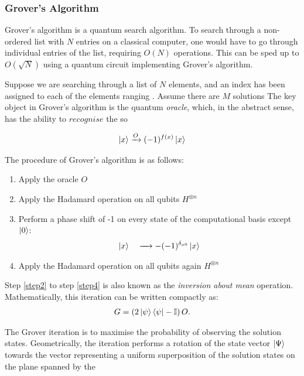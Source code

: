 \documentclass[bibliography=totocnumbered]{article}
\theoremstyle{NoticeStyle}
\begin{document}

\subsubsection{Grover's Algorithm}
Grover's algorithm is a quantum search algorithm. To search through a non-ordered list with $N$ entries on a classical computer, one would have to go through individual entries of the list, requiring $O(N)$ operations. This can be sped up to $O(\sqrt{N})$ using a quantum circuit implementing Grover's algorithm.

Suppose we are searching through a list of $N$ elements, and an index has been assigned to each of the elements ranging . Assume there are $M$ solutions
The key object in Grover's algorithm is the quantum \emph{oracle}, which, in the abstract sense, has the ability to $recognise$ the so

\begin{align}
	\ket{x} \xrightarrow{O} (-1)^{f(x)}\ket{x}
\end{align}

The procedure of Grover's algorithm is as follows:
\begin{enumerate}
	\item Apply the oracle $O$
	\item Apply the Hadamard operation on all qubits $H^{\otimes n}$ \label{step2}
	\item Perform a phase shift of -1 on every state of the computational basis except $\ket{0}$:
		\begin{align}
			\ket{x} \quad 
			\xrightarrow 
			\quad -(-1)^{\delta_{x0}}\ket{x}
		\end{align}
	\item Apply the Hadamard operation on all qubits again $H^{\otimes n}$ \label{step4}
\end{enumerate}
Step \ref{step2} to step \ref{step4} is also known as the \emph{inversion about mean} operation. Mathematically, this iteration can be written compactly as:
\begin{align}
	G = \left(2\ket{\psi}\bra{\psi} - \mathbb{I}\right)O.
\end{align}

The Grover iteration is to maximise the probability of observing the solution states.
Geometrically, the iteration performs a rotation of the state vector $\ket{\Psi}$ towards the vector representing a uniform superposition of the solution states on the plane spanned by the 
\end{document}
